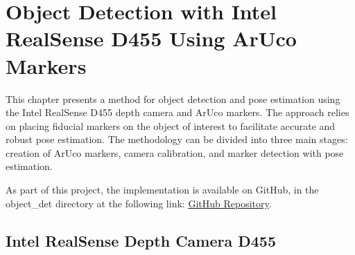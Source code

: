 \chapter{Object Detection with Intel RealSense D455 Using ArUco Markers}

This chapter presents a method for object detection and pose estimation using the Intel RealSense D455 depth camera and ArUco markers. 
The approach relies on placing fiducial markers on the object of interest to facilitate accurate and robust pose estimation. 
The methodology can be divided into three main stages: creation of ArUco markers, camera calibration, and marker detection with pose estimation.

As part of this project, the implementation is available on GitHub, in the object\_det directory at the following link: 
\href{https://github.com/francy2001/relative_navigation.git}{GitHub Repository}.

\section{Intel RealSense Depth Camera D455}

